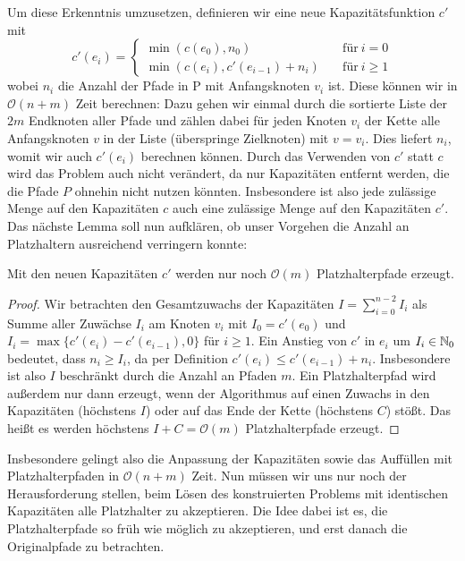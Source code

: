 Um diese Erkenntnis umzusetzen, definieren wir eine neue Kapazitätsfunktion $c'$ mit
\[
	c'(e_i) =
	\begin{cases}
		\min(c(e_0), n_0) &\quad\text{für}\ i=0\\
		\min(c(e_i), c'(e_{i-1}) + n_i) &\quad\text{für}\ i \geq 1
	\end{cases}
\]
wobei $n_i$ die Anzahl der Pfade in P mit Anfangsknoten $v_i$ ist.
Diese können wir in $\mathcal O(n+m)$ Zeit berechnen: Dazu gehen wir einmal durch die sortierte Liste der $2m$ Endknoten
aller Pfade und zählen dabei für jeden Knoten $v_i$ der Kette alle Anfangsknoten $v$ in der Liste (überspringe Zielknoten) mit $v = v_i$.
Dies liefert $n_i$, womit wir auch $c'(e_i)$ berechnen können.
Durch das Verwenden von $c'$ statt $c$ wird das Problem auch nicht verändert, da nur Kapazitäten entfernt
werden, die die Pfade $P$ ohnehin nicht nutzen könnten.
Insbesondere ist also jede zulässige Menge auf den Kapazitäten $c$ auch eine zulässige Menge auf den Kapazitäten $c'$.
Das nächste Lemma soll nun aufklären, ob unser Vorgehen die Anzahl an Platzhaltern ausreichend verringern konnte:

\begin{lemma}
    Mit den neuen Kapazitäten $c'$ werden nur noch $\mathcal O(m)$ Platzhalterpfade erzeugt.
\end{lemma}
\begin{proof}
    Wir betrachten den Gesamtzuwachs der Kapazitäten $I = \sum_{i = 0}^{n-2} I_i$ als Summe aller Zuwächse $I_i$ am
    Knoten $v_i$ mit $I_0 = c'(e_0)$ und $I_i = \max\{c'(e_i) - c'(e_{i-1}), 0\}$ für $i \geq 1$.
    Ein Anstieg von $c'$ in $e_i$ um $I_i \in \mathbb N_0$ bedeutet, dass $n_i \geq I_i$, da per Definition
    $c'(e_i) \leq c'(e_{i-1}) + n_i$.
    Insbesondere ist also $I$ beschränkt durch die Anzahl an Pfaden $m$.
    Ein Platzhalterpfad wird außerdem nur dann erzeugt, wenn der Algorithmus auf einen Zuwachs in den Kapazitäten (höchstens $I$)
    oder auf das Ende der Kette (höchstens $C$) stößt.
    Das heißt es werden höchstens $I + C = \mathcal O(m)$ Platzhalterpfade erzeugt.
\end{proof}

Insbesondere gelingt also die Anpassung der Kapazitäten sowie das Auffüllen mit Platzhalterpfaden in $\mathcal O(n+m)$ Zeit.
Nun müssen wir uns nur noch der Herausforderung stellen, beim Lösen des konstruierten Problems mit identischen Kapazitäten alle
Platzhalter zu akzeptieren.
Die Idee dabei ist es, die Platzhalterpfade so früh wie möglich zu akzeptieren, und erst danach die Originalpfade zu
betrachten.

